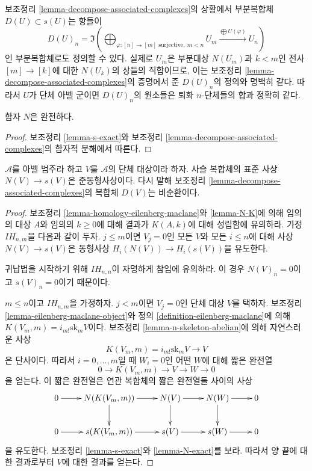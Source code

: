 \begin{remark}
\label{remark-degenerate-subcomplex}
보조정리 \ref{lemma-decompose-associated-complexes}의 상황에서 부분복합체
$D(U) \subset s(U)$는 항들이
$$
D(U)_n = \Im\left(
\bigoplus\nolimits_{\varphi : [n] \to [m]\text{ surjective}, \ m < n} U_m
\xrightarrow{\bigoplus U(\varphi)}
U_n\right)
$$
인 부분복합체로도 정의할 수 있다. 실제로 $U_m$은 부분대상 $N(U_m)$과
$k < m$인 전사 $[m] \to [k]$에 대한 $N(U_k)$의 상들의 직합이므로,
이는 보조정리 \ref{lemma-decompose-associated-complexes}의 증명에서 준
$D(U)_n$의 정의와 명백히 같다. 따라서 $U$가 단체 아벨 군이면
$D(U)_n$의 원소들은 퇴화 $n$-단체들의 합과 정확히 같다.
\end{remark}

\begin{lemma}
\label{lemma-N-exact}
함자 $N$은 완전하다.
\end{lemma}

\begin{proof}
보조정리 \ref{lemma-s-exact}와 보조정리
\ref{lemma-decompose-associated-complexes}의 함자적 분해에서 따른다.
\end{proof}

\begin{lemma}
\label{lemma-quasi-isomorphism}
$\mathcal{A}$를 아벨 범주라 하고 $V$를 $\mathcal{A}$의 단체 대상이라
하자. 사슬 복합체의 표준 사상 $N(V) \to s(V)$은 준동형사상이다.
다시 말해 보조정리 \ref{lemma-decompose-associated-complexes}의 복합체
$D(V)$는 비순환이다.
\end{lemma}

\begin{proof}
보조정리 \ref{lemma-homology-eilenberg-maclane}와 \ref{lemma-N-K}에 의해
임의의 대상 $A$와 임의의 $k \geq 0$에 대해 결과가 $K(A, k)$에
대해 성립함에 유의하라. 가정 $IH_{n, m}$을 다음과 같이 두자.
$j \leq m$이면 $V_j = 0$인 모든 $V$와 모든 $i \leq n$에 대해 사상
$N(V) \to s(V)$은 동형사상
$H_i(N(V)) \to H_i(s(V))$을 유도한다.

\medskip\noindent
귀납법을 시작하기 위해 $IH_{n, n}$이 자명하게 참임에 유의하라.
이 경우 $N(V)_n = 0$이고 $s(V)_n = 0$이기 때문이다.

\medskip\noindent
$m \leq n$이고 $IH_{n, m}$을 가정하자. $j < m$이면 $V_j = 0$인
단체 대상 $V$를 택하자. 보조정리 \ref{lemma-eilenberg-maclane-object}와
정의 \ref{definition-eilenberg-maclane}에 의해
$K(V_m, m) = i_{m!} \text{sk}_mV$이다. 보조정리
\ref{lemma-n-skeleton-abelian}에 의해 자연스러운 사상
$$
K(V_m, m) = i_{m!} \text{sk}_mV \to V
$$
은 단사이다. 따라서 $i = 0, \ldots, m$일 때 $W_i = 0$인 어떤 $W$에
대해 짧은 완전열
$$
0 \to K(V_m, m) \to V \to W \to 0
$$
을 얻는다.
이 짧은 완전열은 연관 복합체의 짧은 완전열들 사이의 사상
$$
\xymatrix{
0 \ar[r] &
N(K(V_m, m)) \ar[r] \ar[d] &
N(V) \ar[r] \ar[d] &
N(W) \ar[r] \ar[d] &
0 \\
0 \ar[r] &
s(K(V_m, m)) \ar[r] &
s(V) \ar[r] &
s(W) \ar[r] &
0
}
$$
을 유도한다. 보조정리 \ref{lemma-s-exact}와 \ref{lemma-N-exact}를 보라.
따라서 양 끝에 대한 결과로부터 $V$에 대한 결과를 얻는다.
\end{proof}




